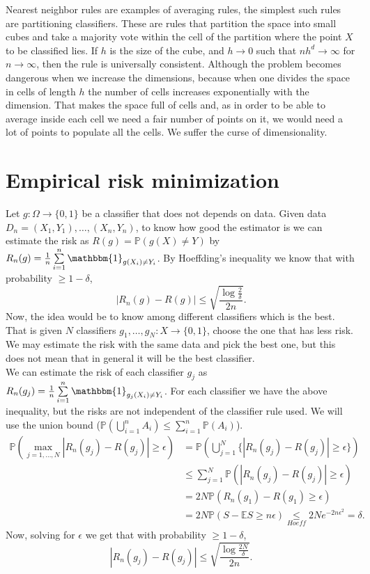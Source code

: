 \documentclass[11pt, english]{article}
\begin{document}
Nearest neighbor rules are examples of averaging rules, the simplest such rules are partitioning classifiers. These are rules that partition the space into small cubes and take a majority vote within the cell of the partition where the point $X$ to be classified lies. If $h$ is the size of the cube, and $h\rightarrow 0$ such that $nh^d\rightarrow \infty$ for $n\rightarrow\infty$, then the rule is universally consistent. 
Although the problem becomes dangerous when we increase the dimensions, because when one divides the space in cells of length $h$ the number of cells increases exponentially with the dimension. That makes the space full of cells and, as in order to be able to average inside each cell we need a fair number of points on it, we would need a lot of points to populate all the cells. We suffer the curse of dimensionality.\\

\section{Empirical risk minimization}

Let $g:\Omega\rightarrow\{0,1\}$ be a classifier that does not depends on data. Given data $D_n=(X_1,Y_1),\dots,(X_n,Y_n)$, to know how good the estimator is we can estimate the risk as $R(g)=\mathbb{P}(g(X)\neq Y)$ by $R_n(g)=\frac{1}{n}\sum\limits_{i=1}^n\mathbbm{1}_{g(X_i)\neq Y_i}$. By Hoeffding's inequality we know that with probability $\geq 1-\delta$, 
\begin{equation}
	|R_n(g)-R(g)|\leq\sqrt{\frac{\log\frac{2}{\delta}}{2n}}.
\end{equation}
Now, the idea would be to know among different classifiers which is the best. That is given $N$ classifiers $g_1,\dots,g_N: X\rightarrow\{0,1\}$, choose the one that has less risk. We may estimate the risk with the same data and pick the best one, but this does not mean that in general it will be the best classifier.\\

We can estimate the risk of each classifier $g_j$ as $R_n(g_j)=\frac{1}{n}\sum\limits_{i=1}^n \mathbbm{1}_{g_j(X_i)\neq Y_i}$. For each classifier we have the above inequality, but the risks are not independent of the classifier rule used. We will use the union bound ($\mathbb{P}(\bigcup\limits_{i=1}^n A_i)\leq\sum\limits_{i=1}^n\mathbb{P}(A_i)$).
\begin{align}
	\mathbb{P}(\underset{j=1,\dots,N}{\max}|R_n(g_j)-R(g_j)|\geq\epsilon) &=\mathbb{P}(\bigcup\limits_{j=1}^N\{|R_n(g_j)-R(g_j)|\geq \epsilon\})\\
	&\leq\sum\limits_{j=1}^N\mathbb{P}(|R_n(g_j)-R(g_j)|\geq\epsilon)\\
	&= 2N\mathbb{P}(R_n(g_1)-R(g_1)\geq\epsilon)\\
	&= 2N\mathbb{P}(S -\mathbb{E}S\geq n\epsilon) \underset{Hoeff}{\leq} 2Ne^{-2n\epsilon^2}=\delta.
\end{align}
Now, solving for $\epsilon$ we get that with probability $\geq 1-\delta$, \begin{equation}
	|R_n(g_j)-R(g_j)|\leq\sqrt{\frac{\log\frac{2 N}{\delta}}{2n}}.
\end{equation}
\end{document}
